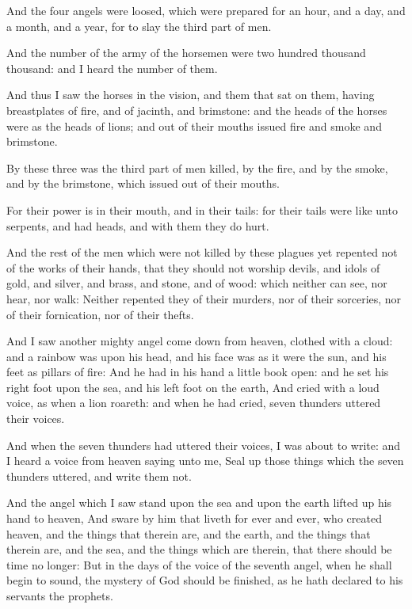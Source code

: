 \Verse And the four angels were loosed, which were prepared for an hour, and a day, and a month, and a year, for to slay the third part of men.

\Verse And the number of the army of the horsemen were two hundred thousand thousand: and I heard the number of them.

\Verse And thus I saw the horses in the vision, and them that sat on them, having breastplates of fire, and of jacinth, and brimstone: and the heads of the horses were as the heads of lions; and out of their mouths issued fire and smoke and brimstone.

\Verse By these three was the third part of men killed, by the fire, and by the smoke, and by the brimstone, which issued out of their mouths.

\Verse For their power is in their mouth, and in their tails: for their tails were like unto serpents, and had heads, and with them they do hurt.

\Verse And the rest of the men which were not killed by these plagues yet repented not of the works of their hands, that they should not worship devils, and idols of gold, and silver, and brass, and stone, and of wood: which neither can see, nor hear, nor walk: \Verse Neither repented they of their murders, nor of their sorceries, nor of their fornication, nor of their thefts.

\Chapter
\Verse And I saw another mighty angel come down from heaven, clothed with a cloud: and a rainbow was upon his head, and his face was as it were the sun, and his feet as pillars of fire: \Verse And he had in his hand a little book open: and he set his right foot upon the sea, and his left foot on the earth, \Verse And cried with a loud voice, as when a lion roareth: and when he had cried, seven thunders uttered their voices.

\Verse And when the seven thunders had uttered their voices, I was about to write: and I heard a voice from heaven saying unto me, Seal up those things which the seven thunders uttered, and write them not.

\Verse And the angel which I saw stand upon the sea and upon the earth lifted up his hand to heaven, \Verse And sware by him that liveth for ever and ever, who created heaven, and the things that therein are, and the earth, and the things that therein are, and the sea, and the things which are therein, that there should be time no longer: \Verse But in the days of the voice of the seventh angel, when he shall begin to sound, the mystery of God should be finished, as he hath declared to his servants the prophets.

